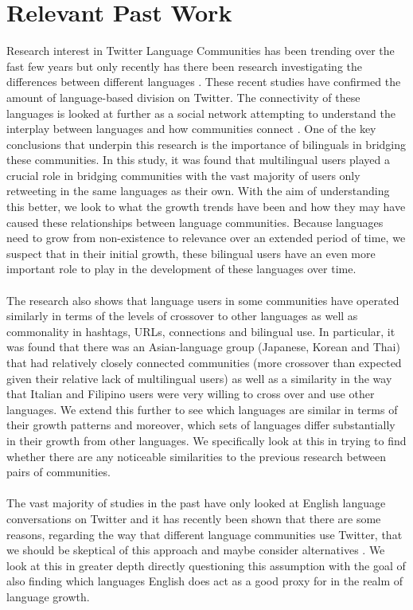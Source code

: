 \documentclass[12pt]{article}
\begin{document}
\section{Relevant Past Work}
 Research interest in Twitter Language Communities has been trending over the fast few years \cite{Delia, Eleta, Garcia, geographies, Goncalves, Gonzalez, Graham, Hecht, Kim, Kwak, Poblete} but only recently has there been research investigating the differences between different languages \cite{Halemain, Hong, Nguyen2}. These recent studies have confirmed the amount of language-based division on Twitter. The connectivity of these languages is looked at further as a social network attempting to understand the interplay between languages and how communities connect \cite{Halemain}. One of the key conclusions that underpin this research is the importance of bilinguals in bridging these communities. In this study, it was found that multilingual users played a crucial role in bridging communities with the vast majority of users only retweeting in the same languages as their own. With the aim of understanding this better, we look to what the growth trends have been and how they may have caused these relationships between language communities. Because languages need to grow from non-existence to relevance over an extended period of time, we suspect that in their initial growth, these bilingual users have an even more important role to play in the development of these languages over time. 
\\\\ The research also shows that language users in some communities have operated similarly in terms of the levels of crossover to other languages as well as commonality in hashtags, URLs, connections \cite{Hong} and bilingual use. In particular, it was found that there was an Asian-language group (Japanese, Korean and Thai) that had relatively closely connected communities (more crossover than expected given their relative lack of multilingual users) as well as a similarity in the way that Italian and Filipino users were very willing to cross over and use other languages. We extend this further to see which languages are similar in terms of their growth patterns and moreover, which sets of languages differ substantially in their growth from other languages. We specifically look at this in trying to find whether there are any noticeable similarities to the previous research between pairs of communities.\\\\
The vast majority of studies in the past have only looked at English language conversations on Twitter \cite{HechtEnglish} and it has recently been shown that there are some reasons, regarding the way that different language communities use Twitter, that we should be skeptical of this approach and maybe consider alternatives \cite{Garcia, Halemain, Hong}. We look at this in greater depth directly questioning this assumption with the goal of also finding which languages English does act as a good proxy for in the realm of language growth.\\\\
\end{document}
